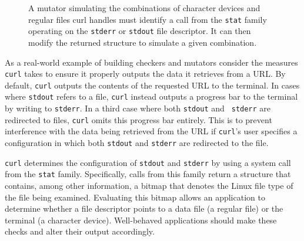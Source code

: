 \begin{figure}[t]
  \center{}
  \caption{A mutator simulating the combinations of character devices and
  regular files curl handles must identify a call from the {\tt stat} family
  operating on the {\tt stderr} or {\tt stdout} file descriptor.  It
  can then modify the returned structure to simulate a given combination.}
  \label{figure:statidentify}
\end{figure}

As a real-world example
of building checkers and mutators
consider the measures {\tt curl} takes
to ensure it properly outputs the data it retrieves from a URL.
By default,
{\tt curl} outputs the contents of the requested URL to the terminal.
In cases where {\tt stdout}
refers to a file, {\tt curl} instead outputs a progress bar to the terminal by
writing to {\tt stderr}.  In a third case where both {\tt stdout} and {\tt
stderr} are redirected to files, {\tt curl} omits this progress bar entirely.
This is to prevent interference
with the data being retrieved from the URL if {\tt curl}'s
user specifies a configuration in which both {\tt stdout} and {\tt stderr} are
redirected to the file.

{\tt curl} determines the configuration of {\tt stdout} and {\tt stderr}
by using a system call from the
{\tt stat} family.  Specifically, calls from this family return a structure that
contains, among other information, a bitmap that denotes the Linux file type of
the file being examined.  Evaluating this bitmap allows an application to
determine whether a file descriptor points to a data file
(a regular file) or the terminal (a character device).
Well-behaved applications should make these checks and alter their output accordingly.


